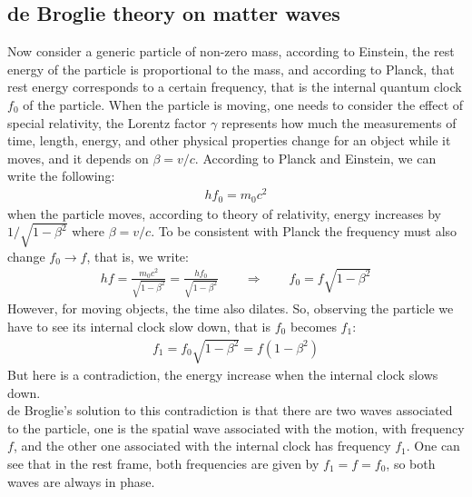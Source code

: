 \documentclass[11pt]{article}
\theoremstyle{break}
\theoremstyle{break}
\begin{document}
\subsection{de Broglie theory on matter waves}
Now consider a generic particle of non-zero mass, according to Einstein, the rest energy of the particle is proportional to the mass, and according to Planck, that rest energy corresponds to a certain frequency, that is the internal quantum clock $f_0$ of the particle. When the particle is moving, one needs to consider the effect of special relativity, the Lorentz factor $\gamma$ represents how much the measurements of time, length, energy, and other physical properties change for an object while it moves, and it depends on $\beta = v/c$. According to Planck and Einstein, we can write the following:
\begin{align*}
hf_0 = m_0c^2
\end{align*}
when the particle moves, according to theory of relativity, energy increases by $1/\sqrt{1-\beta^2}$ where $\beta = v/c$. To be consistent with Planck the frequency must also change $f_0 \to f$, that is, we write:
\begin{align*}
hf = \frac{m_0 c^2}{\sqrt{1-\beta^2}} = \frac{hf_0}{\sqrt{1-\beta^2}}  \qquad \Rightarrow \qquad f_0 = f\sqrt{1-\beta^2}
\end{align*}
However, for moving objects, the time also dilates. So, observing the particle we have to see its internal clock slow down, that is $f_0$ becomes $f_1$:
\begin{align*}
f_1 = f_0 \sqrt{1-\beta^2} = f(1-\beta^2)
\end{align*}
But here is a contradiction, the energy increase when the internal clock slows down. \\

de Broglie's solution to this contradiction is that there are two waves associated to the particle, one is the spatial wave associated with the motion, with frequency $f$, and the other one associated with the internal clock has frequency $f_1$. One can see that in the rest frame, both frequencies are given by $f_1 = f = f_0$, so both waves are always in phase. \\
\end{document}

